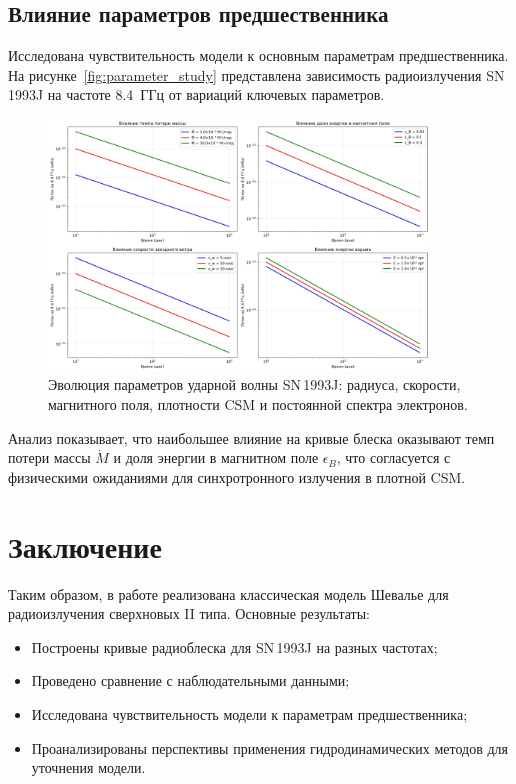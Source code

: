 \documentclass[a4paper,12pt]{extarticle}
\begin{document}
\subsection{Влияние параметров предшественника}

Исследована чувствительность модели к основным параметрам предшественника. На рисунке~\ref{fig:parameter_study} представлена зависимость радиоизлучения SN\,1993J на частоте 8.4~ГГц от вариаций ключевых параметров.
\begin{figure}[h]
    \centering
    \includegraphics[width=0.9\textwidth]{SN1993J_parameter_study.jpg}
    \caption{Эволюция параметров ударной волны SN\,1993J: радиуса, скорости, магнитного поля, плотности CSM и постоянной спектра электронов.}
    \label{fig:precursor parameters}
\end{figure}
Анализ показывает, что наибольшее влияние на кривые блеска оказывают темп потери массы $\dot{M}$ и доля энергии в магнитном поле $\epsilon_B$, что согласуется с физическими ожиданиями для синхротронного излучения в плотной CSM.

\clearpage
\section{Заключение}

Таким образом, в работе реализована классическая модель Шевалье для радиоизлучения сверхновых II типа. Основные результаты:

\begin{itemize}
    \item Построены кривые радиоблеска для SN\,1993J на разных частотах;
    \item Проведено сравнение с наблюдательными данными;
    \item Исследована чувствительность модели к параметрам предшественника;
    \item Проанализированы перспективы применения гидродинамических методов для уточнения модели.
\end{itemize}
\end{document}
